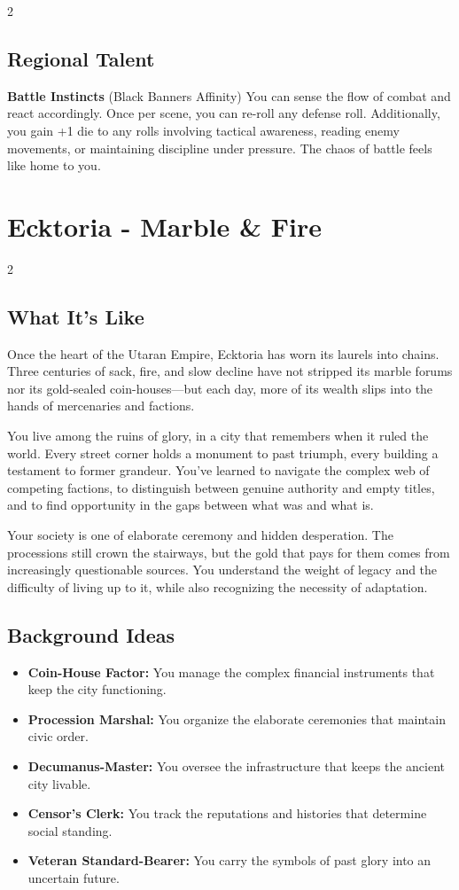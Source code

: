 \documentclass[11pt]{article}
\newcommand{\region}[1]{\section*{#1}}
\newcommand{\subregion}[1]{\subsection*{#1}}
\begin{document}
\begin{multicols}{2}
\subregion{Regional Talent}

\textbf{Battle Instincts} (Black Banners Affinity)
You can sense the flow of combat and react accordingly. Once per scene, you can re-roll any defense roll. Additionally, you gain +1 die to any rolls involving tactical awareness, reading enemy movements, or maintaining discipline under pressure. The chaos of battle feels like home to you.

\end{multicols}

\region{Ecktoria - Marble \& Fire}

\begin{multicols}{2}
\subregion{What It's Like}

Once the heart of the Utaran Empire, Ecktoria has worn its laurels into chains. Three centuries of sack, fire, and slow decline have not stripped its marble forums nor its gold-sealed coin-houses---but each day, more of its wealth slips into the hands of mercenaries and factions.

You live among the ruins of glory, in a city that remembers when it ruled the world. Every street corner holds a monument to past triumph, every building a testament to former grandeur. You've learned to navigate the complex web of competing factions, to distinguish between genuine authority and empty titles, and to find opportunity in the gaps between what was and what is.

Your society is one of elaborate ceremony and hidden desperation. The processions still crown the stairways, but the gold that pays for them comes from increasingly questionable sources. You understand the weight of legacy and the difficulty of living up to it, while also recognizing the necessity of adaptation.

\columnbreak

\subregion{Background Ideas}

\begin{itemize}[leftmargin=*]
    \item \textbf{Coin-House Factor:} You manage the complex financial instruments that keep the city functioning.
    \item \textbf{Procession Marshal:} You organize the elaborate ceremonies that maintain civic order.
    \item \textbf{Decumanus-Master:} You oversee the infrastructure that keeps the ancient city livable.
    \item \textbf{Censor's Clerk:} You track the reputations and histories that determine social standing.
    \item \textbf{Veteran Standard-Bearer:} You carry the symbols of past glory into an uncertain future.
\end{itemize}


\end{multicols}
\end{document}
